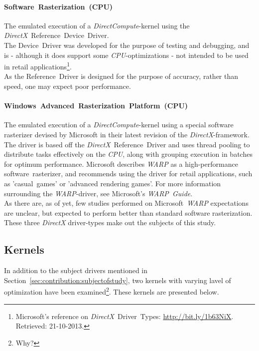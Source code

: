 \documentclass[fleqn,10pt]{SelfArx} %
\begin{document}
\paragraph{Software~Rasterization~(CPU)}
	The emulated execution of a \textit{DirectCompute}-kernel using the \textit{DirectX}~Reference~Device~Driver.\\
The Device~Driver was developed for the purpose of testing and debugging, and is - although it does support some \textit{CPU}-optimizations - not intended to be used in retail applications\footnote{\label{lab:drivertypes}Microsoft's reference on \textit{DirectX}~Driver~Types: \url{http://bit.ly/1b63NiX}. Retrieved: 21-10-2013.}.\\
	As the Reference~Driver is designed for the purpose of accuracy, rather than speed, one may expect poor performance.
\paragraph{Windows~Advanced~Rasterization~Platform~(CPU)}
	The emulated execution of a \textit{DirectCompute}-kernel using a special software rasterizer devised by Microsoft in their latest revision of the \textit{DirectX}-framework.\\
	The driver is based off the \textit{DirectX}~Reference~Driver and uses thread pooling to distribute tasks effectively on the \textit{CPU}, along with grouping execution in batches for optimum performance. Microsoft describes \textit{WARP} as a high-performance software~rasterizer, and recommends using the driver for retail applications, such as 'casual~games' or 'advanced rendering games'. For more information surrounding the \textit{WARP}-driver, see Microsoft's \textit{WARP~Guide}.\\
As there are, as of yet, few studies performed on Microsoft~\textit{WARP} expectations are unclear, but expected to perform better than standard software rasterization.\\

\noindent
These three \textit{DirectX} driver-types make out the subjects of this study.

\subsection{Kernels}
\label{sec:contribution:kernels}
In addition to the subject drivers mentioned in Section~\ref{sec:contribution:subjectofstudy}, two kernels with varying lavel of optimization have been examined\footnote{Why?}. These kernels are presented below.
\end{document}
